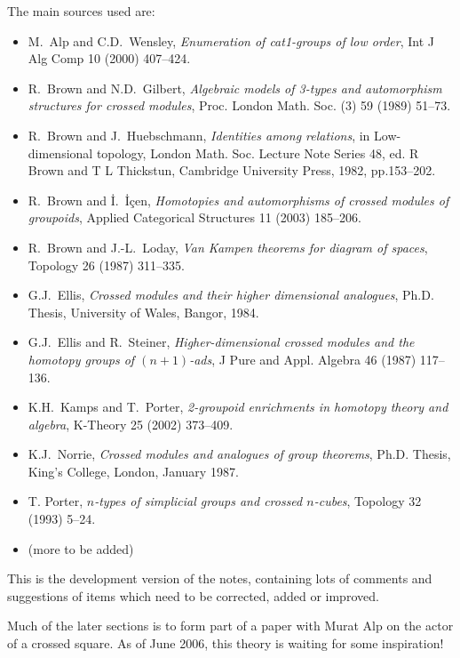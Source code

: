 \bigskip
The main sources used are:
\begin{itemize}
\item
M.~Alp and C.D.~Wensley,
\emph{Enumeration of cat1-groups of low order},
Int J Alg Comp 10 (2000) 407--424.

\item
R.~Brown and N.D.~Gilbert,
\emph{Algebraic models of 3-types and automorphism
structures for crossed modules},
Proc. London Math. Soc. (3) 59 (1989) 51--73.
\item
R.~Brown and J.~Huebschmann, \emph{Identities among relations},
in Low-dimensional topology, London Math. Soc. Lecture Note Series 48,
ed. R Brown and T L Thickstun, Cambridge University Press, 1982, pp.153--202.

\item
R.~Brown and  \.{I}.~\.{I}\c{c}en,
\emph{Homotopies and automorphisms of crossed modules of groupoids},
Applied Categorical Structures 11 (2003) 185--206.

\item
R.~Brown and  J.-L.~Loday,
\emph{Van Kampen theorems for diagram of spaces},
Topology 26 (1987) 311--335.

\item
G.J.~Ellis, 
\emph{Crossed modules and their higher dimensional analogues},
Ph.D. Thesis, University of Wales, Bangor, 1984.

\item
G.J.~Ellis and R.~Steiner,
\emph{Higher-dimensional crossed modules and the
homotopy groups of $(n+1)$-ads},
J Pure and Appl. Algebra 46 (1987) 117--136.

\item
K.H.~Kamps and T.~Porter,
\emph{2-groupoid enrichments in homotopy theory and algebra},
K-Theory 25 (2002) 373--409.

\item
K.J.~Norrie, 
\emph{Crossed modules and analogues of group theorems},
Ph.D. Thesis, King's College, London, January 1987.

\item
T. Porter,
\emph{$n$-types of simplicial groups and crossed $n$-cubes},
Topology 32 (1993) 5--24.

\item
(more to be added)
\end{itemize}

\bigskip

This is the development version of the notes, containing lots of
comments and suggestions of items which need to be corrected, added
or improved.

Much of the later sections is to form part of a paper with Murat Alp
on the actor of a crossed square.  
As of June 2006, this theory is waiting for some inspiration!

